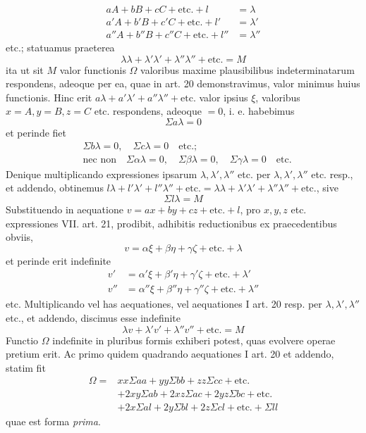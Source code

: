 \[
\begin{aligned}
aA+bB+cC+\text{etc.}+l&=\lambda\\
a'A+b'B+c'C+\text{etc.}+l'&=\lambda'\\
a''A+b''B+c''C+\text{etc.}+l''&=\lambda''
\end{aligned}
\]
etc.; statuamus praeterea
\[
\lambda\lambda+\lambda'\lambda'+\lambda''\lambda''+\text{etc.}=M
\]
ita ut sit \(M\) valor functionis \(\Omega\) valoribus maxime plausibilibus indeterminatarum respondens, adeoque per ea, quae in art. 20 demonstravimus, valor minimus huius functionis. Hinc erit \(a\lambda+a'\lambda'+a''\lambda''+\text{etc.}\) valor ipsius \(\xi\), valoribus \(x=A,\allowbreak y=B,\allowbreak z=C\) etc. respondens, adeoque \(=0\), i. e. habebimus
\[
\Sigma a\lambda=0
\]
et perinde fiet
\[
\begin{aligned}
&\Sigma b\lambda=0,\quad\Sigma c\lambda=0\quad\text{etc.;}\\
&\text{nec non}\quad\Sigma\alpha\lambda=0,\quad\Sigma\beta\lambda=0,\quad\Sigma\gamma\lambda=0\quad\text{etc.}
\end{aligned}
\]
Denique multiplicando expressiones ipsarum \(\lambda,\lambda',\lambda''\) etc. per \(\lambda,\lambda',\lambda''\) etc. resp., et addendo, obtinemus \(l\lambda+l'\lambda'+l''\lambda''+\text{etc.}=\lambda\lambda+\lambda'\lambda'+\lambda''\lambda''+\text{etc.}\), sive
\[
\Sigma l\lambda=M
\]
Substituendo in aequatione \(v=ax+by+cz+\text{etc.}+l\), pro \(x,y,z\) etc. expressiones VII. art. 21, prodibit, adhibitis reductionibus ex praecedentibus obviis,
\[
v=\alpha\xi+\beta\eta+\gamma\zeta+\text{etc.}+\lambda
\]
et perinde erit indefinite
\[
\begin{aligned}
v'&=\alpha'\xi+\beta'\eta+\gamma'\zeta+\text{etc.}+\lambda'\\
v''&=\alpha''\xi+\beta''\eta+\gamma''\zeta+\text{etc.}+\lambda''
\end{aligned}
\]
etc. Multiplicando vel has aequationes, vel aequationes I art. 20 resp. per \(\lambda,\lambda',\lambda''\) etc., et addendo, discimus esse indefinite
\[
\lambda v+\lambda'v'+\lambda''v''+\text{etc.}=M
\]
Functio \(\Omega\) indefinite in pluribus formis exhiberi potest, quas evolvere operae pretium erit. Ac primo quidem quadrando aequationes I art. 20 et addendo, statim fit
\[
\begin{aligned}
\Omega={}&xx\Sigma aa+yy\Sigma bb+zz\Sigma cc+\text{etc.}\\
&+2xy\Sigma ab+2xz\Sigma ac+2yz\Sigma bc+\text{etc.}\\
&+2x\Sigma al+2y\Sigma bl+2z\Sigma cl+\text{etc.}+\Sigma ll
\end{aligned}
\]
quae est forma \textit{prima}.

